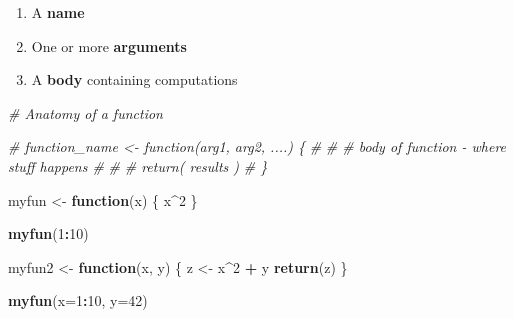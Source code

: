 \documentclass[]{book}
\newenvironment{Shaded}{\begin{snugshade}}{\end{snugshade}}
\newcommand{\CommentTok}[1]{\textcolor[rgb]{0.56,0.35,0.01}{\textit{#1}}}
\newcommand{\ControlFlowTok}[1]{\textcolor[rgb]{0.13,0.29,0.53}{\textbf{#1}}}
\newcommand{\DataTypeTok}[1]{\textcolor[rgb]{0.13,0.29,0.53}{#1}}
\newcommand{\DecValTok}[1]{\textcolor[rgb]{0.00,0.00,0.81}{#1}}
\newcommand{\KeywordTok}[1]{\textcolor[rgb]{0.13,0.29,0.53}{\textbf{#1}}}
\newcommand{\NormalTok}[1]{#1}
\newcommand{\OperatorTok}[1]{\textcolor[rgb]{0.81,0.36,0.00}{\textbf{#1}}}
\newcommand{\StringTok}[1]{\textcolor[rgb]{0.31,0.60,0.02}{#1}}
\providecommand{\tightlist}{%
  \setlength{\itemsep}{0pt}\setlength{\parskip}{0pt}}
\begin{document}
\begin{enumerate}
\def\labelenumi{\arabic{enumi}.}
\tightlist
\item
  A \textbf{name}
\item
  One or more \textbf{arguments}
\item
  A \textbf{body} containing computations
\end{enumerate}

\begin{Shaded}
\begin{Highlighting}[]
\CommentTok{# Anatomy of a function}

\CommentTok{# function_name <- function(arg1, arg2, ....) \{}
\CommentTok{#  }
\CommentTok{#   # body of function - where stuff happens #}
\CommentTok{#}
\CommentTok{#   return( results ) }
\CommentTok{# \}}

\NormalTok{myfun <-}\StringTok{ }\ControlFlowTok{function}\NormalTok{(x) \{}
\NormalTok{  x}\OperatorTok{^}\DecValTok{2}
\NormalTok{\}}

\KeywordTok{myfun}\NormalTok{(}\DecValTok{1}\OperatorTok{:}\DecValTok{10}\NormalTok{)}

\NormalTok{myfun2 <-}\StringTok{ }\ControlFlowTok{function}\NormalTok{(x, y) \{}
\NormalTok{  z <-}\StringTok{ }\NormalTok{x}\OperatorTok{^}\DecValTok{2} \OperatorTok{+}\StringTok{ }\NormalTok{y}
  \KeywordTok{return}\NormalTok{(z)}
\NormalTok{\}}

\KeywordTok{myfun}\NormalTok{(}\DataTypeTok{x=}\DecValTok{1}\OperatorTok{:}\DecValTok{10}\NormalTok{, }\DataTypeTok{y=}\DecValTok{42}\NormalTok{)}
\end{Highlighting}
\end{Shaded}

\begin{Shaded}
\end{Shaded}
\end{document}
